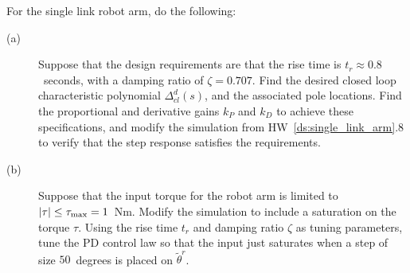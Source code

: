For the single link robot arm, do the following:
\begin{description}

\item[(a)]  Suppose that the design requirements are that the rise time is
$t_r \approx 0.8$~seconds, with a damping ratio of $\zeta=0.707$.  Find the desired closed loop characteristic polynomial $\Delta_{cl}^d(s)$, and the associated pole locations. Find the proportional and derivative gains $k_P$ and $k_D$ to achieve these specifications, and modify the simulation from HW~\ref{ds:single_link_arm}.8 to verify that the step response satisfies the requirements.

\item[(b)] Suppose that the input torque for the robot arm is limited to $\left|\tau\right|\leq\tau_{\max}=1$~Nm.  Modify the simulation to include a saturation on the torque $\tau$.  Using the rise time $t_r$ and damping ratio $\zeta$ as tuning parameters, tune the PD control law  so that the input just saturates when a step of size $50$~degrees is placed on $\tilde{\theta}^r$.

\end{description}